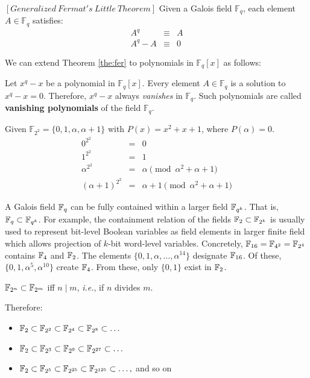 \begin{Theorem}\label{the:fer}
 $\left[Generalized\  Fermat's\  Little\  Theorem \right]$ Given a
 Galois field $\mathbb{F}_{q}$, each element $A \in \mathbb{F}_{q}$ satisfies: 
\begin{eqnarray}\label{fe}
 A^{q} & \equiv & A  \nonumber \\
 A^{q} - A & \equiv& 0  
\end{eqnarray}
\end{Theorem} 

We can extend Theorem \ref{the:fer} to polynomials in $\mathbb{F}_{q}[x]$ as 
follows: 
\begin{Definition}
Let $x^q-x$ be a polynomial in $\mathbb{F}_{q}[x]$.
Every element $A \in \mathbb{F}_{q}$ is a solution to  $x^q-x=0$. 
Therefore, $x^{q} - x$ always {\it vanishes} in $\mathbb{F}_{q}$. Such 
polynomials are called {\bf vanishing polynomials} of the field $\mathbb{F}_{q}$.
\end{Definition}

\begin{Example}
Given $\mathbb{F}_{2^2} =\{0,1,\alpha,\alpha+1\}$ with $P(x)=x^2+x+1$, where $P(\alpha)=0$. 
 \begin{eqnarray}
 0^{2^2}&=&0 \nonumber \\
 1^{2^2}&=&1 \nonumber \\
 \alpha^{2^2}&=&\alpha \pmod {\alpha^2+\alpha+1}\nonumber \\
 (\alpha+1)^{2^2}&=&\alpha+1 \pmod {\alpha^2+\alpha+1} \nonumber 
 \end{eqnarray}
\end{Example}

A Galois field ${\mathbb{F}}_q$ can be fully contained within a larger field ${\mathbb{F}}_{q^k}$.
That is, ${\mathbb{F}}_q \subset {\mathbb{F}}_{q^k}$.
For example, the containment relation of the fields 
${\mathbb{F}}_2 \subset {\mathbb{F}}_{2^k}$ is usually used to represent bit-level Boolean variables as field elements
in larger finite field which allows projection of $k$-bit word-level variables. 
Concretely, ${\mathbb{F}}_{16}={\mathbb{F}}_{4^2}={\mathbb{F}}_{2^4}$ contains ${\mathbb{F}}_4$ and ${\mathbb{F}}_2$.
The elements $\{0,1,\alpha,\dots,\alpha^{14}\}$
designate ${\mathbb{F}}_{16}$. Of these, $\{0,1,\alpha^5,\alpha^{10}\}$ create ${\mathbb{F}}_4$.
From these, only $\{0,1\}$ exist in ${\mathbb{F}}_2$.

\begin{Theorem}
${\mathbb{F}}_{2^n}\subset{\mathbb{F}}_{2^m}$ iff $n \mid m$, {\it i.e.}, if $n$ divides $m$.
\end{Theorem}

Therefore:
\begin{itemize}
\item ${\mathbb{F}}_2 \subset {\mathbb{F}}_{2^2} \subset {\mathbb{F}}_{2^4} \subset {\mathbb{F}}_{2^8} \subset \dots$
\item ${\mathbb{F}}_2 \subset {\mathbb{F}}_{2^3} \subset {\mathbb{F}}_{2^9} \subset {\mathbb{F}}_{2^{27}} \subset \dots$
\item ${\mathbb{F}}_2 \subset {\mathbb{F}}_{2^5} \subset {\mathbb{F}}_{2^{25}} \subset {\mathbb{F}}_{2^{125}} \subset \dots,$ and so on
\end{itemize}

